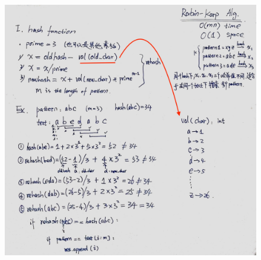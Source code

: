 \documentclass[a4paper,10pt]{article}
\begin{document}
\begin{figure}[h]
    \includegraphics[width=\textwidth]{leetcode28-3.jpg}
    \centering \\
\end{figure}
\end{document}
